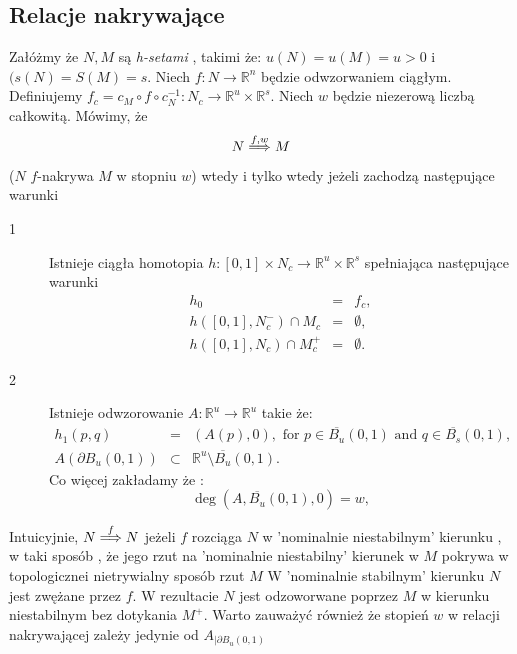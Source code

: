 \subsection{Relacje nakrywające}
\begin{definition} \cite{ZGi}
\label{def:covw} 
Załóżmy że $N,M$ są {\em h-setami } , takimi że: $u(N)=u(M)=u > 0$ i $(s(N)=S(M)=s$.
Niech $f:N \to {\mathbb R}^n$ będzie odwzorwaniem ciągłym. 
Definiujemy $f_c = c_M \circ f \circ c_N^{-1}: N_c \to {\mathbb R}^u \times {\mathbb R}^s $.
Niech $w$ będzie niezerową liczbą całkowitą. 
Mówimy, że 
\begin{displaymath}
  N\stackrel{f,w}{\Longrightarrow} M
\end{displaymath}
($N$ $f$-nakrywa $M$ w stopniu $w$) wtedy i tylko wtedy jeżeli zachodzą następujące warunki
\begin{description}
\item[1] %
   Istnieje ciągła homotopia $h:[0,1]\times N_c \to {\mathbb R}^u \times {\mathbb R}^s$ spełniająca następujące
   warunki
   \begin{eqnarray}
      h_0&=&f_c,  \label{eq:hc1} \\
      h([0,1],N_c^-) \cap M_c &=& \emptyset ,  \label{eq:hc2} \\
      h([0,1],N_c) \cap M_c^+ &=& \emptyset .\label{eq:hc3}
   \end{eqnarray}
\item[2] 
	Istnieje odwzorowanie $A:{\mathbb R} ^u \to {\mathbb R}^u$ takie że:
   \begin{eqnarray}
    h_1(p,q)&=&(A(p),0), \mbox{ for $p \in \overline{B_u}(0,1)$ and $q \in
    \overline{B_s}(0,1)$,}\label{eq:hc4}\\
      A(\partial B_u(0,1)) &\subset & {\mathbb R}^u \setminus
      \overline{B_u}(0,1).  \label{eq:mapaway}
   \end{eqnarray}
  Co więcej zakładamy że :
\begin{displaymath}
  \deg(A,\overline {B_u}(0,1),0)=w,
\end{displaymath}
\end{description}
\end{definition}

Intuicyjnie, $N \stackrel{f}{\Longrightarrow} N$ jeżeli $f$ rozciąga $N$ w 
'nominalnie niestabilnym' kierunku , w taki sposób , że jego rzut na 
'nominalnie niestabilny' kierunek w $M$ pokrywa w topologicznei nietrywialny sposób rzut $M$
W 'nominalnie stabilnym' kierunku $N$ jest zwężane przez $f$. W rezultacie $N$ jest odzoworwane
poprzez $M$ w kierunku niestabilnym bez dotykania $M^+$. 
Warto zauważyć również że stopień $w$ w relacji nakrywającej zależy jedynie
od $A_{|\partial B_u(0,1)}$


